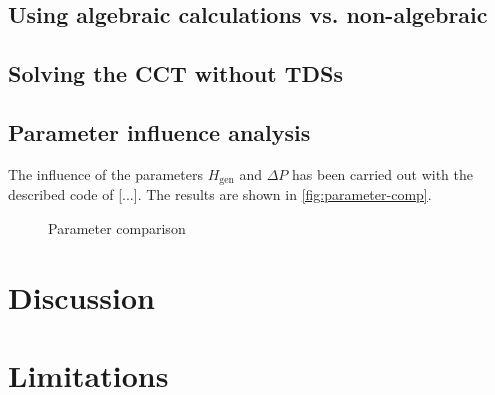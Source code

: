 \subsection{Using algebraic calculations vs. non-algebraic}

\subsection{Solving the \acs{CCT} without \acsp{TDS}}

\subsection{Parameter influence analysis}

The influence of the parameters $H_\mathrm{gen}$ and $\Delta P$ has been carried out with the described code of [...]. The results are shown in \autoref{fig:parameter-comp}.

\begin{figure}[H]
        \centering
        
        \caption[Parameter comparison]{Parameter comparison}
        \label{fig:parameter-comp}
\end{figure}

\section{Discussion}
\label{sec:discussion}



\section{Limitations}

